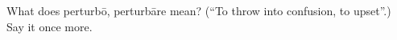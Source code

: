 \begin{tcolorbox}[breakable,colback=teal!4,colframe=teal!35!black,title={Before you move on}]
What does perturbō, perturbāre mean? (\textquotedblleft{}To throw into confusion, to upset\textquotedblright{}.) Say it once more.
\end{tcolorbox}
